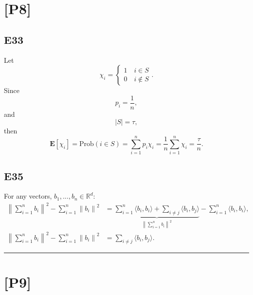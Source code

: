 \documentclass[12pt]{article}
\begin{document}
\section*{[P8]}
\subsection*{E33}
Let
\begin{equation*}
    \chi_i = 
    \begin{cases}
        1 \quad i \in S\\
        0 \quad i \notin S
    \end{cases}
    .
\end{equation*}
Since
\begin{equation*}
    p_i = \frac{1}{n},
\end{equation*}
and
\begin{equation*}
    |S| = \tau,
\end{equation*}
then 
\begin{equation*}
    \textbf{E}[\chi_i] = \text{Prob}(i \in S) = \sum^n_{i=1} p_i \chi_i = \frac{1}{n} \sum^n_{i=1} \chi_i = \frac{\tau}{n}.
\end{equation*}

\subsection*{E35}
For any vectors, $b_1, ..., b_n \in \mathbb{R}^d$:
\begin{equation*}
    \begin{split}
        \left\|\sum^n_{i=1} b_i \right\|^2 - \sum^n_{i=1}  \left\| b_i \right\|^2 &= \underbrace{\sum^n_{i=1} \langle b_i, b_i\rangle + \sum_{i \neq j} \langle b_i, b_j \rangle}_{\left\|\sum^n_{i=1} b_i \right\|^2} - \sum^n_{i=1} \langle b_i, b_i\rangle, \\
        \left\|\sum^n_{i=1} b_i \right\|^2 - \sum^n_{i=1}  \left\| b_i \right\|^2 &= \sum_{i \neq j} \langle b_i, b_j \rangle.
    \end{split}
\end{equation*}

\hrule
\vspace{0.1cm}
\section*{[P9]}
\end{document}
